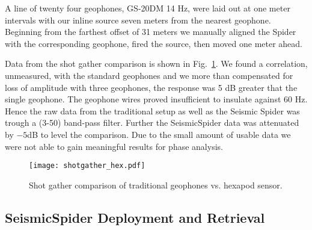 A line of twenty four geophones, GS-20DM 14 Hz, were laid out at one meter intervals with our inline source seven meters from the nearest geophone. Beginning from the farthest offset of 31 meters we manually aligned the Spider with the corresponding geophone, fired the source, then moved one meter ahead. 

Data from the shot gather comparison is shown in Fig.~\ref{fig:shotgatherHexpod}.
We found a correlation, unmeasured, with the standard geophones and we more than compensated for loss of amplitude with three geophones, the response was 5 dB greater that the single geophone. The geophone wires proved insufficient to insulate against 60 Hz. Hence the raw data from the traditional setup as well as the Seismic Spider was trough a (3-50) band-pass filter. Further the SeismicSpider data was attenuated by $-5$dB to level the comparison.  Due to the small amount of usable data we were not able to gain meaningful results for phase analysis.   

\begin{figure} \centering
  {\texttt{[image: shotgather\_hex.pdf]}}
 \caption{Shot gather comparison of traditional geophones vs. hexapod sensor. 
 \label{fig:shotgatherHexpod}}
\end{figure}



\subsection{SeismicSpider Deployment and Retrieval}

